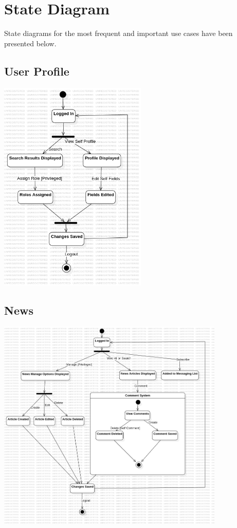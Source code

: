 \documentclass[11pt]{article}
\begin{document}
\section{State Diagram}

State diagrams for the most frequent and important use cases have been presented below.


\subsection{User Profile}
\begin{center}
\includegraphics[height=4in]{state_diagrams/StateMachine1!UserProfile_1.png}
\end{center}

\subsection{News}
\begin{center}
\includegraphics[height=4in]{state_diagrams/StateMachine2!News_2.png}
\end{center}
\end{document}
